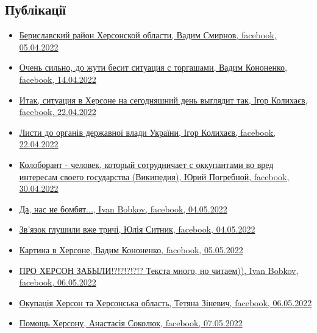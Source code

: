  
 
 
 
 
\subsection{Публікації}

\begin{itemize} %

\item \hyperlink{05_04_2022.fb.smirnov_vadim.odessa.rieltor.1.berislav_rajon}{%
Бериславский район Херсонской области, Вадим Смирнов, facebook, 05.04.2022%
}

\item \hyperlink{14_04_2022.fb.kononenko_vadim.herson.1.torgashi}{%
Очень сильно, до жути бесит ситуация с торгашами, Вадим Кононенко, facebook, 14.04.2022%
}

\item \hyperlink{22_04_2022.fb.kolyhaev_igor.herson.mer.1.herson}{%
Итак, ситуация в Херсоне на сегодняшний день выглядит так, Ігор Колихаєв, facebook, 22.04.2022%
}

\item \hyperlink{26_04_2022.fb.kolyhaev_igor.herson.mer.1.lysty}{%
Листи до органів державної влади України, Ігор Колихаєв, facebook, 22.04.2022%
}

\item \hyperlink{30_04_2022.fb.pogrebnoj_jurij.herson.1.koloborant}{%
Колоборант - человек, который сотрудничает с оккупантами во вред интересам своего государства (Википедия), %
Юрий Погребной, facebook, 30.04.2022%
}

\item \hyperlink{04_05_2022.fb.bobkov_ivan.1.nas_ne_bombjat}{%
Да, нас не бомбят..., Ivan Bobkov, facebook, 04.05.2022%
}

\item \hyperlink{04_05_2022.fb.sytnik_julia.herson.1.zvjazok_glyshili_trychi}{%
Зв'язок глушили вже тричі, Юлія Ситник, facebook, 04.05.2022%
}

\item \hyperlink{05_05_2022.fb.kononenko_vadim.herson.1.kartina_v_hersone}{%
Картина в Херсоне, Вадим Кононенко, facebook, 05.05.2022%
}

\item \hyperlink{06_05_2022.fb.bobkov_ivan.1.pro_herson_zabyli}{%
ПРО ХЕРСОН ЗАБЫЛИ!?!?!?!?!?  Текста много, но читаем)), Ivan Bobkov, facebook, 06.05.2022%
}

\item \hyperlink{06_05_2022.fb.zinevich_tetjana.herson.1.okupacia}{%
Окупація Херсон та Херсонська область, Тетяна Зіневич, facebook, 06.05.2022%
}

\item \hyperlink{07_05_2022.fb.sokoljuk_anastasia.1.pomosch_hersonu}{%
Помощь Херсону, Анастасія Соколюк, facebook, 07.05.2022%
}

\end{itemize} %
